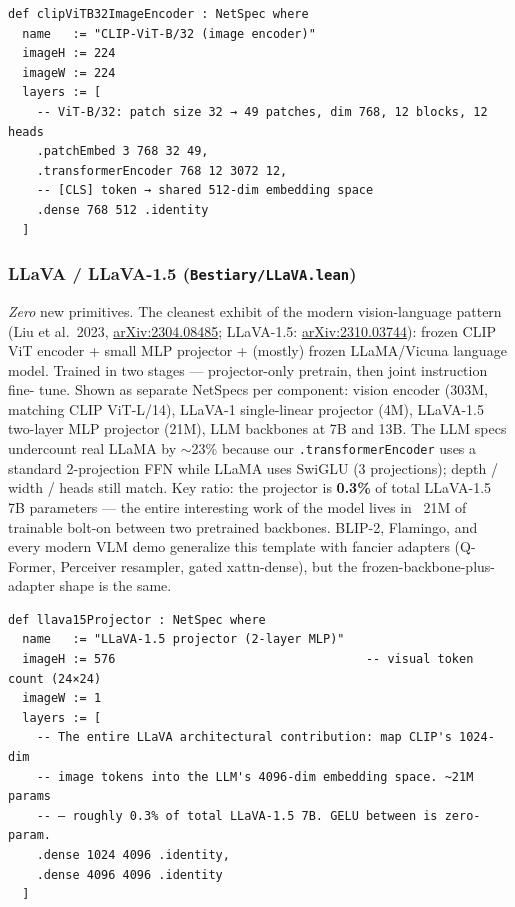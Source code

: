 \begin{verbatim}
def clipViTB32ImageEncoder : NetSpec where
  name   := "CLIP-ViT-B/32 (image encoder)"
  imageH := 224
  imageW := 224
  layers := [
    -- ViT-B/32: patch size 32 → 49 patches, dim 768, 12 blocks, 12 heads
    .patchEmbed 3 768 32 49,
    .transformerEncoder 768 12 3072 12,
    -- [CLS] token → shared 512-dim embedding space
    .dense 768 512 .identity
  ]
\end{verbatim}

\subsubsection*{LLaVA / LLaVA-1.5 (\texttt{Bestiary/LLaVA.lean})}
\emph{Zero} new primitives. The cleanest exhibit of the modern
vision-language pattern (Liu et al.\ 2023,
\href{https://arxiv.org/abs/2304.08485}{arXiv:2304.08485}; LLaVA-1.5:
\href{https://arxiv.org/abs/2310.03744}{arXiv:2310.03744}): frozen CLIP ViT encoder + small MLP
projector + (mostly) frozen LLaMA/Vicuna language model. Trained in
two stages --- projector-only pretrain, then joint instruction fine-
tune. Shown as separate NetSpecs per component: vision encoder
(303M, matching CLIP ViT-L/14), LLaVA-1 single-linear projector
(4M), LLaVA-1.5 two-layer MLP projector (21M), LLM backbones at 7B
and 13B. The LLM specs undercount real LLaMA by $\sim$23\% because
our \texttt{.transformerEncoder} uses a standard 2-projection FFN
while LLaMA uses SwiGLU (3 projections); depth / width / heads still
match. Key ratio: the projector is \textbf{0.3\%} of total LLaVA-1.5
7B parameters --- the entire interesting work of the model lives in
~21M of trainable bolt-on between two pretrained backbones. BLIP-2,
Flamingo, and every modern VLM demo generalize this template with
fancier adapters (Q-Former, Perceiver resampler, gated xattn-dense),
but the frozen-backbone-plus-adapter shape is the same.

\begin{verbatim}
def llava15Projector : NetSpec where
  name   := "LLaVA-1.5 projector (2-layer MLP)"
  imageH := 576                                   -- visual token count (24×24)
  imageW := 1
  layers := [
    -- The entire LLaVA architectural contribution: map CLIP's 1024-dim
    -- image tokens into the LLM's 4096-dim embedding space. ~21M params
    -- — roughly 0.3% of total LLaVA-1.5 7B. GELU between is zero-param.
    .dense 1024 4096 .identity,
    .dense 4096 4096 .identity
  ]
\end{verbatim}

